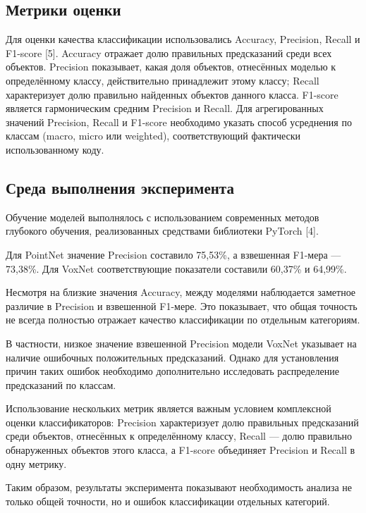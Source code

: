 \documentclass{misisarticle}
\begin{document}
\subsection{Метрики оценки}
Для оценки качества классификации использовались Accuracy, Precision, Recall и F1-score [5]. Accuracy отражает долю правильных предсказаний среди всех объектов. Precision показывает, какая доля объектов, отнесённых моделью к определённому классу, действительно принадлежит этому классу; Recall характеризует долю правильно найденных объектов данного класса. F1-score является гармоническим средним Precision и Recall. Для агрегированных значений Precision, Recall и F1-score необходимо указать способ усреднения по классам (macro, micro или weighted), соответствующий фактически использованному коду.\par
\subsection{Среда выполнения эксперимента}
Обучение моделей выполнялось с использованием современных методов глубокого обучения, реализованных средствами библиотеки PyTorch [4].\par
Для PointNet значение Precision составило 75,53\%, а взвешенная F1-мера — 73,38\%. Для VoxNet соответствующие показатели составили 60,37\% и 64,99\%.\par
Несмотря на близкие значения Accuracy, между моделями наблюдается заметное различие в Precision и взвешенной F1-мере. Это показывает, что общая точность не всегда полностью отражает качество классификации по отдельным категориям.\par
В частности, низкое значение взвешенной Precision модели VoxNet указывает на наличие ошибочных положительных предсказаний. Однако для установления причин таких ошибок необходимо дополнительно исследовать распределение предсказаний по классам.\par
Использование нескольких метрик является важным условием комплексной оценки классификаторов: Precision характеризует долю правильных предсказаний среди объектов, отнесённых к определённому классу, Recall — долю правильно обнаруженных объектов этого класса, а F1-score объединяет Precision и Recall в одну метрику.\par
Таким образом, результаты эксперимента показывают необходимость анализа не только общей точности, но и ошибок классификации отдельных категорий.\par
\end{document}
